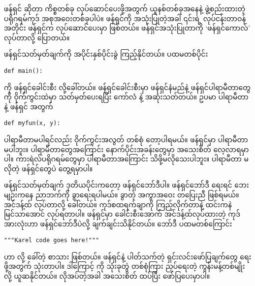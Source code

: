 \begin{mytcbox}
ဖန်ရှင်  ဆိုတာ ကိစ္စတစ်ခု လုပ်ဆောင်ပေးဖို့အတွက် ယူနစ်တစ်ခုအနေနဲ့ ဖွဲ့စည်းထားတဲ့ ပရိုဂရမ်ကုဒ် အစုအဝေးတစ်ခုပါပဲ။ ဖန်ရှင်ကို အသုံးပြုတဲ့အခါ ၎င်းရဲ့ လုပ်ငန်းတာဝန်အတိုင်း ဖန်ရှင်က လုပ်ဆောင်ပေးမှာ ဖြစ်တယ်။ ဖန်ရှင်အသုံးပြုတာကို ‘ဖန်ရှင်ကောလ်’   လုပ်တာလို့ ပြောတယ်။
\end{mytcbox}
%
 ဖန်ရှင်သတ်မှတ်ချက်ကို အပိုင်းနှစ်ပိုင်းခွဲ ကြည့်နိုင်တယ်။ ပထမတစ်ပိုင်း
%
\setlength{\fboxsep}{0pt}
\begin{verbatim}
def main():
\end{verbatim}
%
ကို ဖန်ရှင်ခေါင်းစီး  လို့ခေါ်တယ်။ ဖန်ရှင်ခေါင်းစီးမှာ ဖန်ရှင်နံမည်နဲ့ ဖန်ရှင်ပါရာမီတာတွေကို ဝိုက်ကွင်းထဲမှာ သတ်မှတ်ပေးရပြီး ကော်လံ \mytcboxinl{\fCode{:}} နဲ့ အဆုံးသတ်တယ်။ ဥပမာ \fEn{,}  ပါရာမီတာ နဲ့   ဖန်ရှင် အတွက် 
%
\setlength{\fboxsep}{0pt}
\begin{verbatim}
def myfun(x, y):
\end{verbatim}
ပါရာမီတာမပါရင်လည်း ဝိုက်ကွင်းအလွတ် တစ်စုံ \mytcboxinl{\fCode{()}} တော့ပါရမယ်။  ဖန်ရှင်မှာ ပါရာမီတာ မပါဘူး။ ပါရာမီတာတွေအကြောင်း နောက်ပိုင်းအခန်းတွေမှာ အသေးစိတ် လေ့လာရမှာပါ။ ကားရဲလ်ပရိုဂရမ်တွေမှာ ပါရာမီတာအကြောင်း သိဖို့မလိုသေးပါဘူး။ ပါရာမီတာ မလိုတဲ့ ဖန်ရှင်တွေပဲ တွေ့ရမှာပါ။ 

ဖန်ရှင်သတ်မှတ်ချက် ဒုတိယပိုင်းကတော့ ဖန်ရှင်ဘော်ဒီပါ။ ဖန်ရှင်ဘော်ဒီ ရေးရင် ဘေးမျဉ်းကနေ ညာဘက်ကို ခွာရေးရပါမယ်။ ခွာတဲ့ အကွာအဝေး တပြေးညီ ဖြစ်ရမယ်။  အင်ဒန့်ထ်  လုပ်တာလို့ ခေါ်တယ်။ ကုဒ်စထရက်ချာကို ကြည့်လိုက်တာနဲ့ ထင်းကနဲ မြင်သာအောင် လုပ်ရတာပါ။  ဖန်ရှင်မှာ ခေါင်းစီးအောက် အင်ဒန့်ထ်လုပ်ထားတဲ့ ကုဒ်အားလုံးဟာ ဖန်ရှင်ဘော်ဒီပဲလို့ ချက်ချင်းသိနိုင်တယ်။ ဘော်ဒီ ပထမတစ်ကြောင်း
\setlength{\fboxsep}{0pt}
\begin{verbatim}
"""Karel code goes here!"""
\end{verbatim}
ဟာ  လို့ ခေါ်တဲ့ စာသား ဖြစ်တယ်။ ဖန်ရှင်နဲ့ ပါတ်သက်တဲ့ ရှင်းလင်းဖော်ပြချက်တွေ ရေးဖို့အတွက် သုံးတာပါ။ ဒါကြောင့်  ကို  သုံးခုတွဲ  တစ်စုံကြား ညှပ်ရေးတဲ့ ကွန်းမန့်တစ်မျိုးလို့ ယူဆနိုင်တယ်။ လိုအပ်တဲ့အခါ အသေးစိတ် ထပ်ပြီး ဖော်ပြပေးမှာပါ။

